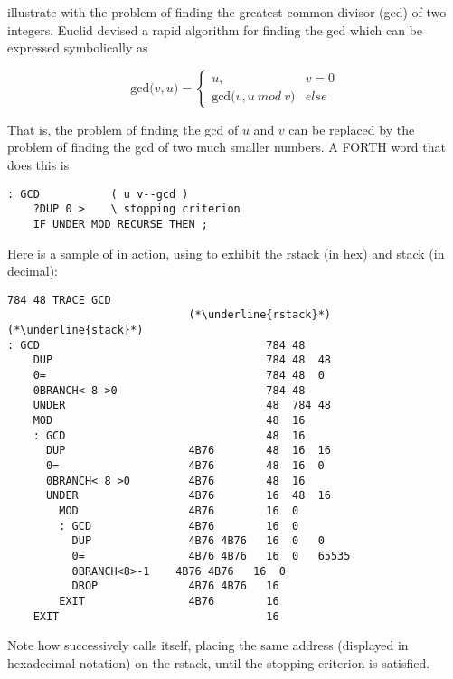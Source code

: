  illustrate with the problem of finding the greatest common divisor (gcd) of two integers. Euclid devised a rapid algorithm for finding the gcd which can be expressed symbolically as

\begin{equation}
    \text{gcd(}v, u \text{)} =
    \begin{cases}
        u, & v= 0 \\
        \text{gcd(}v, u\ mod\ v\text{)} & else
    \end{cases}
\end{equation}
    
That is, the problem of finding the gcd of $u$ and $v$ can be replaced by the problem of finding the gcd of two much smaller numbers. A FORTH word that does this is

\begin{lstlisting}
: GCD           ( u v--gcd )
    ?DUP 0 >    \ stopping criterion
    IF UNDER MOD RECURSE THEN ;
\end{lstlisting}

Here is a sample of  in action, using  to exhibit the rstack (in hex) and stack (in decimal):

\begin{lstlisting}
784 48 TRACE GCD
                            (*\underline{rstack}*)       (*\underline{stack}*)
: GCD                                   784 48
    DUP                                 784 48  48
    0=                                  784 48  0
    0BRANCH< 8 >0                       784 48
    UNDER                               48  784 48
    MOD                                 48  16
    : GCD                               48  16
      DUP                   4B76        48  16  16
      0=                    4B76        48  16  0
      0BRANCH< 8 >0         4B76        48  16
      UNDER                 4B76        16  48  16
        MOD                 4B76        16  0
        : GCD               4B76        16  0
          DUP               4B76 4B76   16  0   0
          0=                4B76 4B76   16  0   65535
          0BRANCH<8>-1    4B76 4B76   16  0
          DROP              4B76 4B76   16
        EXIT                4B76        16
    EXIT                                16
\end{lstlisting}

Note how  successively calls itself, placing the same address (displayed in hexadecimal notation) on the rstack, until the stopping criterion is satisfied.


